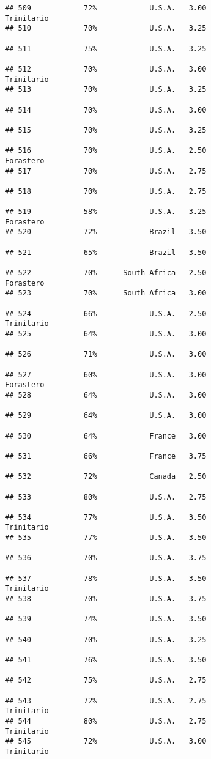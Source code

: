 \documentclass[
]{article}
\begin{document}
\begin{verbatim}
## 509            72%            U.S.A.   3.00               Trinitario
## 510            70%            U.S.A.   3.25                         
## 511            75%            U.S.A.   3.25                         
## 512            70%            U.S.A.   3.00               Trinitario
## 513            70%            U.S.A.   3.25                         
## 514            70%            U.S.A.   3.00                         
## 515            70%            U.S.A.   3.25                         
## 516            70%            U.S.A.   2.50                Forastero
## 517            70%            U.S.A.   2.75                         
## 518            70%            U.S.A.   2.75                         
## 519            58%            U.S.A.   3.25                Forastero
## 520            72%            Brazil   3.50                         
## 521            65%            Brazil   3.50                         
## 522            70%      South Africa   2.50                Forastero
## 523            70%      South Africa   3.00                         
## 524            66%            U.S.A.   2.50               Trinitario
## 525            64%            U.S.A.   3.00                         
## 526            71%            U.S.A.   3.00                         
## 527            60%            U.S.A.   3.00                Forastero
## 528            64%            U.S.A.   3.00                         
## 529            64%            U.S.A.   3.00                         
## 530            64%            France   3.00                         
## 531            66%            France   3.75                         
## 532            72%            Canada   2.50                         
## 533            80%            U.S.A.   2.75                         
## 534            77%            U.S.A.   3.50               Trinitario
## 535            77%            U.S.A.   3.50                         
## 536            70%            U.S.A.   3.75                         
## 537            78%            U.S.A.   3.50               Trinitario
## 538            70%            U.S.A.   3.75                         
## 539            74%            U.S.A.   3.50                         
## 540            70%            U.S.A.   3.25                         
## 541            76%            U.S.A.   3.50                         
## 542            75%            U.S.A.   2.75                         
## 543            72%            U.S.A.   2.75               Trinitario
## 544            80%            U.S.A.   2.75               Trinitario
## 545            72%            U.S.A.   3.00               Trinitario

\end{verbatim}
\end{document}
